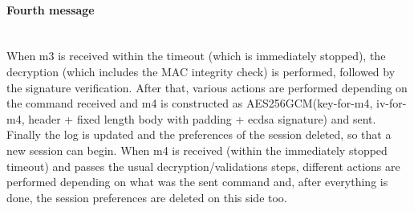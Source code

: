 \paragraph{Fourth message}\hspace{0pt}\\
When m3 is received within the timeout (which is immediately stopped), the decryption (which includes the MAC integrity check) is performed, followed by the signature verification. After that, various actions are performed depending on the command received and m4 is constructed as  AES256GCM(key-for-m4, iv-for-m4, header + fixed length body with padding + ecdsa signature) and sent. Finally the log is updated and the preferences of the session deleted, so that a new session can begin. When m4 is received (within the immediately stopped timeout) and passes the usual decryption/validations steps, different actions are performed depending on what was the sent command and, after everything is done, the session preferences are deleted on this side too.
